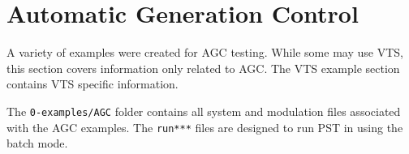 \pagebreak
\section{Automatic Generation Control} 
A variety of examples were created for AGC testing.
While some may use VTS, this section covers information only related to AGC.
The VTS example section contains VTS specific information.

The \verb|0-examples/AGC| folder contains all system and modulation files associated with the AGC examples.
The \verb|run***| files are designed to run PST in using the batch mode.